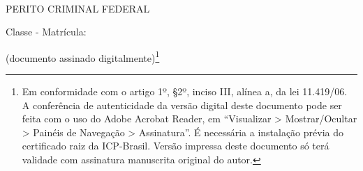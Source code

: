 \bigskip
\begin{center}
	~\bigskip

	\textbf{\MakeUppercase{\pfauthor}}
	
	PERITO CRIMINAL FEDERAL
	
	Classe \pfauthorclass\space - Matrícula: \pfauthormatr

	(documento assinado digitalmente)\footnote{%
		Em conformidade com o artigo 1º, \S 2º, inciso III, alínea a, da lei 11.419/06.
		A conferência de autenticidade da versão digital deste documento pode ser feita com o uso do Adobe Acrobat Reader, em ``Visualizar > Mostrar/Ocultar > Painéis de Navegação > Assinatura''. É necessária a instalação prévia do certificado raiz da ICP-Brasil.
		Versão impressa deste documento só terá validade com assinatura manuscrita original do autor.
	}
\end{center}
